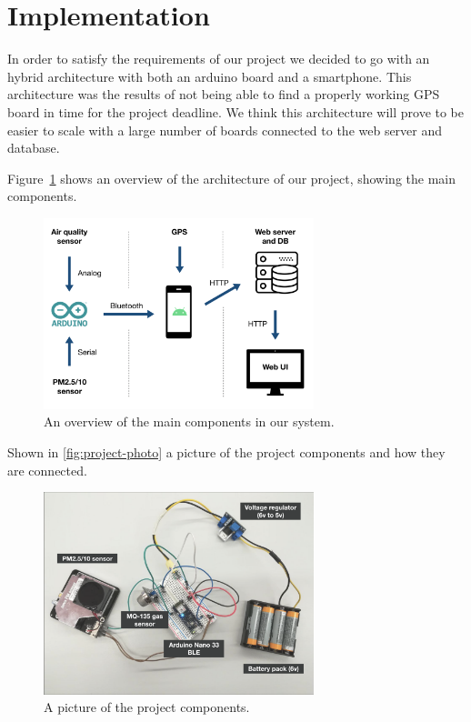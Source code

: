 \documentclass[12pt]{article}
\begin{document}
  \section{Implementation}
  In order to satisfy the requirements of our project we decided to go with an hybrid architecture with both an arduino board and a smartphone. This architecture was the results of not being able to find a properly working GPS board in time for the project deadline. We think this architecture will prove to be easier to scale with a large number of boards connected to the web server and database.

  Figure~\ref{fig:architecture} shows an overview of the architecture of our project, showing the main components.
  \begin{figure}[H]
    \centering
    \includegraphics[width=0.7\textwidth]{images/architecture.png}
    \caption{An overview of the main components in our system.}
    \label{fig:architecture}
  \end{figure}

  Shown in \autoref{fig:project-photo} a picture of the project components and how they are connected.
  \begin{figure}[H]
    \centering
    \includegraphics[width=0.7\textwidth]{images/project-all.png}
    \caption{A picture of the project components.}
    \label{fig:project-photo}
  \end{figure}
  
\end{document}
